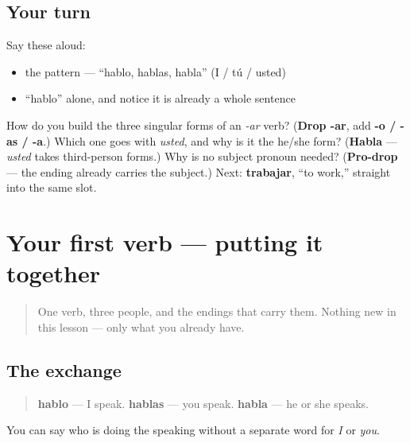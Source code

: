 \subsection*{Your turn}
Say these aloud:

\begin{itemize}
\raggedright
  \item the pattern — \textquotedblleft{}hablo, hablas, habla\textquotedblright{} (I / tú / usted)
  \item \textquotedblleft{}hablo\textquotedblright{} alone, and notice it is already a whole sentence
\end{itemize}

\begin{tcolorbox}[breakable,colback=teal!4,colframe=teal!35!black,title={Before you move on}]
How do you build the three singular forms of an \emph{-ar} verb? (\textbf{Drop -ar}, add \textbf{-o / -as / -a}.) Which one goes with \emph{usted}, and why is it the he/she form? (\textbf{Habla} — \emph{usted} takes third-person forms.) Why is no subject pronoun needed? (\textbf{Pro-drop} — the ending already carries the subject.) Next: \textbf{trabajar}, \textquotedblleft{}to work,\textquotedblright{} straight into the same slot.
\end{tcolorbox}
\section[Practice]{Your first verb — putting it together}

\label{lesson:ES-C06-repaso-hablar}



\begin{quote}
One verb, three people, and the endings that carry them. Nothing new in this lesson — only what you already have.
\end{quote}

\subsection*{The exchange}
\begin{quote}
\textbf{hablo} — I speak. \textbf{hablas} — you speak. \textbf{habla} — he or she speaks.
\end{quote}

\begin{grammarlens}[title={What you've built}]
You can say who is doing the speaking without a separate word for \emph{I} or \emph{you}.
\end{grammarlens}

